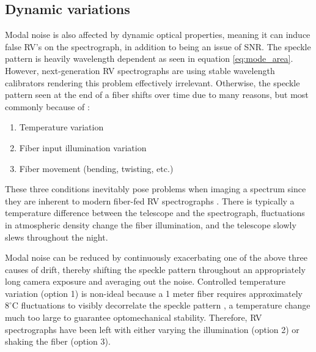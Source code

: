 \documentclass[twocolumn]{emulateapj}
\begin{document}
\subsection{Dynamic variations}

Modal noise is also affected by dynamic optical properties, meaning it can induce false RV's on the spectrograph, in addition to being an issue of SNR. The speckle pattern is heavily wavelength dependent as seen in equation \ref{eq:mode_area}. However, next-generation RV spectrographs are using stable wavelength calibrators rendering this problem effectively irrelevant. Otherwise, the speckle pattern seen at the end of a fiber shifts over time due to many reasons, but most commonly because of \citep{Epworth1978}:
\begin{enumerate}
\item Temperature variation
\item Fiber input illumination variation
\item Fiber movement (bending, twisting, etc.)
\end{enumerate}
These three conditions inevitably pose problems when imaging a spectrum since they are inherent to modern fiber-fed RV spectrographs \citep{Baudrand2001, Mahadevan2014}. There is typically a temperature difference between the telescope and the spectrograph, fluctuations in atmospheric density change the fiber illumination, and the telescope slowly slews throughout the night.


Modal noise can be reduced by continuously exacerbating one of the above three causes of drift, thereby shifting the speckle pattern throughout an appropriately long camera exposure and averaging out the noise. Controlled temperature variation (option 1) is non-ideal because a 1 meter fiber requires approximately $8 ^\circ \mathrm{C}$ fluctuations to visibly decorrelate the speckle pattern \citep{Redding2013}, a temperature change much too large to guarantee optomechanical stability. Therefore, RV spectrographs have been left with either varying the illumination (option 2) or shaking the fiber (option 3).
\end{document}
